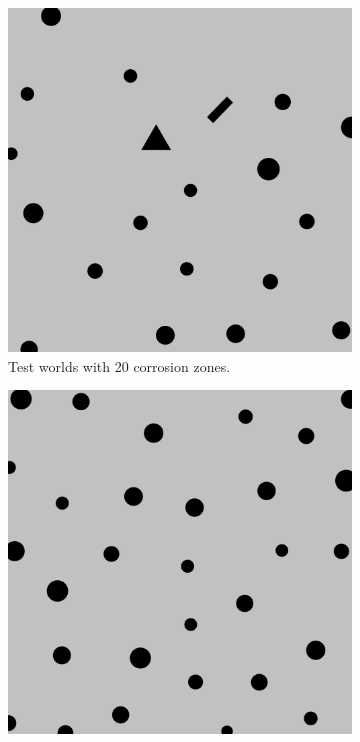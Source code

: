 \documentclass[english,RandD]{rapportPFE}  %
\begin{document}
\begin{figure}[H]
\begin{subfigure}[t]{0.15\linewidth}
				\includegraphics[width=\linewidth]{graphics/test_model_20_1.png}
				\caption{Test worlds with 20 corrosion zones.}
				\label{fig:test_model_20_1}
			\end{subfigure}
			\hfill
			\begin{subfigure}[t]{0.15\linewidth}
				\centering
				\includegraphics[width=\linewidth]{graphics/test_model_30_1.png}

\end{subfigure}
\end{figure}
\end{document}
